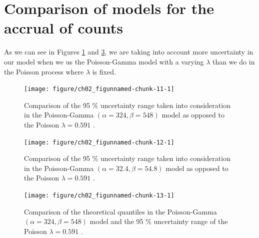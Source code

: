 \section{Comparison of models for the accrual of counts}

As we can see in Figures \ref{fig:2_10} and \ref{fig:2_11}, we are taking into account more uncertainty in our model when we us the Poisson-Gamma model with a varying $\lambda$ than we do in the Poisson process where $\lambda$ is fixed.

\begin{figure}
\begin{knitrout}
\color{fgcolor}

{\centering \texttt{[image: figure/ch02\_figunnamed-chunk-11-1]} 

}


\end{knitrout}
  \caption{Comparison of the 95 \% uncertainty range taken into consideration in the Poisson-Gamma $(\alpha = 324, \beta = 548)$ model as opposed to the Poisson $\lambda = 0.591$ \citep{spiegelhalter2011visualizing, pkgacc}.}
  \label{fig:2_10}
\end{figure}


\begin{figure}
\begin{knitrout}
\color{fgcolor}

{\centering \texttt{[image: figure/ch02\_figunnamed-chunk-12-1]} 

}


\end{knitrout}
  \caption{Comparison of the 95 \% uncertainty range taken into consideration in the Poisson-Gamma $(\alpha = 32.4, \beta = 54.8)$ model as opposed to the Poisson $\lambda = 0.591$ \citep{spiegelhalter2011visualizing, pkgacc}.}
  \label{fig:2_10a}
\end{figure}

\begin{figure}
\begin{knitrout}
\color{fgcolor}

{\centering \texttt{[image: figure/ch02\_figunnamed-chunk-13-1]} 

}


\end{knitrout}
  \caption{Comparison of the theoretical quantiles in the Poisson-Gamma $(\alpha = 324, \beta = 548)$ model and the 95 \% uncertainty range of the Poisson $\lambda = 0.591$ \citep{spiegelhalter2011visualizing, pkgacc}.}
  \label{fig:2_11}
\end{figure}


